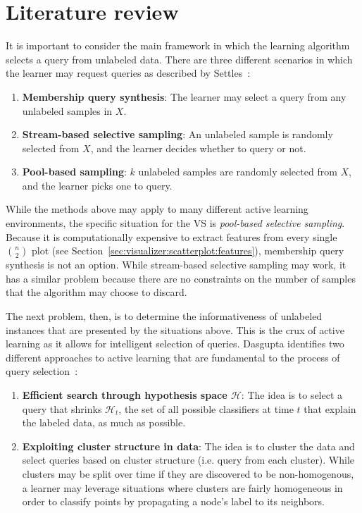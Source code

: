 \section{Literature review}
\label{sec:al:litreview}

It is important to consider the main framework in which the learning algorithm 
selects a query from unlabeled data. There are three different 
scenarios in which the learner may request queries as described by 
Settles~\cite{settles2010}:
 
\tablespacing
\begin{enumerate}
	\item \textbf{Membership query synthesis}: The learner may select a query 
	from any unlabeled samples in $X$.
	\item \textbf{Stream-based selective sampling}: An unlabeled sample is 
	randomly selected from $X$, and the learner decides whether to query or not.
	\item \textbf{Pool-based sampling}: $k$ unlabeled samples are randomly 
	selected from $X$, and the learner picks one to query.
\end{enumerate}
\bodyspacing

\noindent While the methods above may apply to many different active learning 
environments, the specific situation for the VS is \textit{pool-based selective 
sampling}. Because it is computationally expensive to extract features from 
every single $n\choose2$ plot (see 
Section~\ref{sec:visualizer:scatterplot:features}), membership query synthesis 
is not an option. While stream-based selective sampling may work, it has a 
similar problem because there are no constraints
on the number of samples that the algorithm may choose to discard. 

The next problem, then, is to determine the informativeness of unlabeled 
instances that are presented by the situations above. This is the crux of 
active learning as it allows for intelligent selection of queries.
Dasgupta identifies two different approaches to active learning that are 
fundamental to the process of query selection~\cite{dasgupta2011}: 

\tablespacing
\begin{enumerate}
	\item \textbf{Efficient search through hypothesis space $\mathcal{H}$}: 
	The idea is to select a query that shrinks $\mathcal{H}_t$, the set of all 
	possible classifiers at time $t$ that explain the labeled data, as much as 
	possible. 
	\item \textbf{Exploiting cluster structure in data}: 
	The idea is to cluster the data and select queries based on cluster 
	structure (i.e. query from each cluster). While clusters may be split over 
	time if they are discovered to be non-homogenous, a learner may leverage 
	situations where clusters are fairly homogeneous in order to classify 
	points by propagating a node's label to its neighbors. 
\end{enumerate}
\bodyspacing


